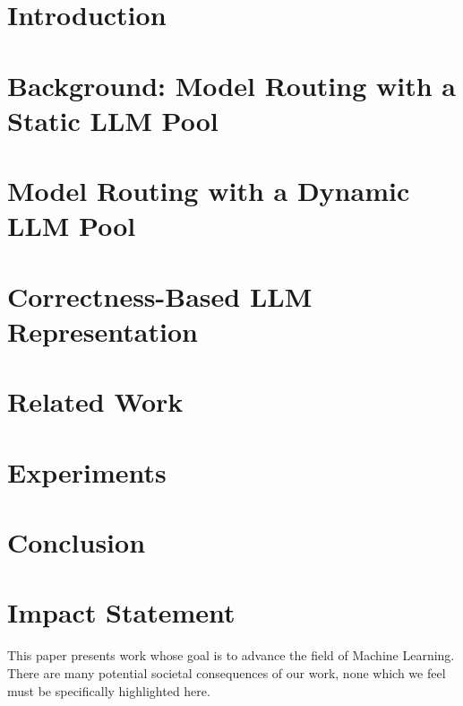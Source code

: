 

\section{Introduction}


\section{Background: Model Routing with a Static LLM Pool}
\label{sec:background}


\section{Model Routing with a Dynamic LLM Pool}
\label{sec:dynamic_routing}


\section{Correctness-Based LLM Representation}
\label{sec:proposal}


\section{Related Work}
\label{sec:related}


\section{Experiments}
\label{sec:experiments}


\section{Conclusion}




\ifarxiv
\else
\section*{Impact Statement}
This paper presents work whose goal is to advance the field of Machine
Learning. There are many potential societal consequences of our work,
none which we feel must be specifically highlighted here.
\fi

